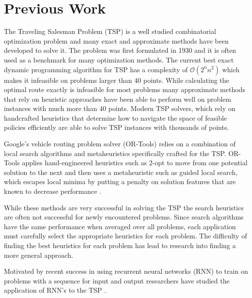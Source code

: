 \documentclass[12pt]{article}
\begin{document}


\section{Previous Work}

The Traveling Salesman Problem (TSP) is a well studied combinatorial optimization problem and many exact and approximate methods have been developed to solve it. The problem was first formulated in 1930 and it is often used as a benchmark for many optimization methods. The current best exact dynamic programming algorithm for TSP has a complexity of $\mathcal{O}(2^nn^2)$ which makes it infeasible on problems larger than 40 points. While calculating the optimal route exactly is infeasible for most problems many approximate methods that rely on heuristic approaches have been able to perform well on problem instances with much more than 40 points. Modern TSP solvers, which rely on handcrafted heuristics that determine how to navigate the space of feasible policies efficiently are able to solve TSP instances with thousands of points. %

Google's vehicle routing problem solver (OR-Tools) relies on a combination of local search algorithms and metaheuristics specifically crafted for the TSP. OR-Tools applies hand-engineered heuristics such as 2-opt to move from one potential solution to the next and then uses a metaheuristic such as guided local search, which escapes local minima by putting a penalty on solution features that are known to decrease performance \citep{2016_Bello}.

While these methods are very successful in solving the TSP the search heuristics are often not successful for newly encountered problems. Since search algorithms have the same performance when averaged over all problems, each application must carefully select the appropriate heuristics for each problem. The difficulty of finding the best heuristics for each problem has lead to research into finding a more general approach.

Motivated by recent success in using recurrent neural networks (RNN) to train on problems with a sequence for input and output researchers have studied the application of RNN's to the TSP \citep{2014_sut}.
\end{document}
